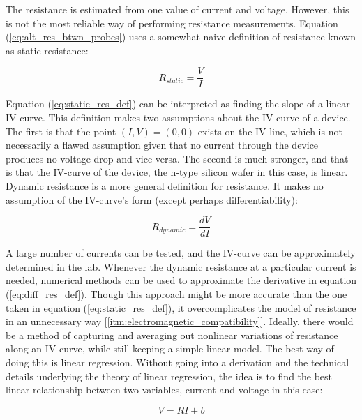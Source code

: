 \documentclass{article}
\begin{document}


The resistance is estimated from one value of current and voltage. However, this is not the most reliable way of performing resistance measurements.
Equation (\ref{eq:alt_res_btwn_probes}) uses a somewhat naive definition of resistance known as static resistance:

\begin{equation}
\label{eq:static_res_def}
R_{static} = \frac{V}{I}
\end{equation}

Equation (\ref{eq:static_res_def}) can be interpreted as finding the slope of a linear IV-curve. This definition makes two assumptions about the IV-curve of a device. The first is that the point $(I,V) = (0,0)$ exists on the IV-line, which is not necessarily a flawed assumption given that no current through the device produces no voltage drop and vice versa. The second is much stronger, and that is that the IV-curve of the device, the n-type silicon wafer in this case, is linear.
Dynamic resistance is a more general definition for resistance. It makes no assumption of the IV-curve's form (except perhaps differentiability):

\begin{equation}
\label{eq:diff_res_def}
R_{dynamic} = \frac{dV}{dI}
\end{equation}

A large number of currents can be tested, and the IV-curve can be approximately determined in the lab. Whenever the dynamic resistance at a particular current is needed, numerical methods can be used to approximate the derivative in equation (\ref{eq:diff_res_def}). Though this approach might be more accurate than the one taken in equation (\ref{eq:static_res_def}), it overcomplicates the model of resistance in an unnecessary way [\ref{itm:electromagnetic_compatibility}].
Ideally, there would be a method of capturing and averaging out nonlinear variations of resistance along an IV-curve, while still keeping a simple linear model. The best way of doing this is linear regression. Without going into a derivation and the technical details underlying the theory of linear regression, the idea is to find the best linear relationship between two variables, current and voltage in this case:

\begin{equation}
\label{eq:linear_reg}
V = RI + b
\end{equation}
\end{document}
